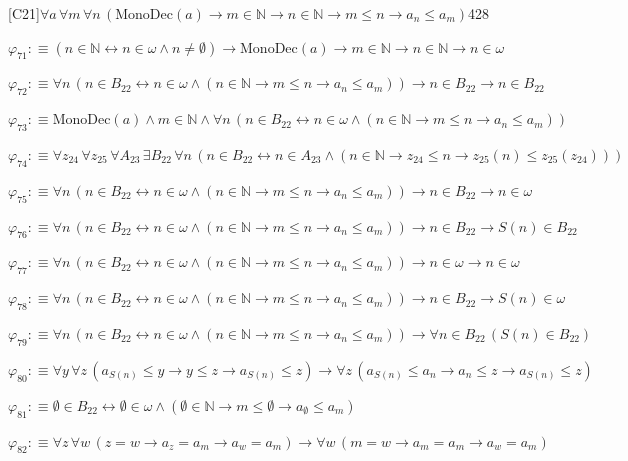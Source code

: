 \begin{fullproof}{[C21]}{$\forall a\,\forall m\,\forall n\,(\mathrm{MonoDec}(a) \to m \in \mathbb{N} \to n \in \mathbb{N} \to m \leq n \to a_{n} \leq a_{m})$}{428}
\begin{abbrevlist}
\item $\varphi_{71} :\equiv (n \in \mathbb{N} \leftrightarrow n \in \omega \land n \neq \emptyset) \to \mathrm{MonoDec}(a) \to m \in \mathbb{N} \to n \in \mathbb{N} \to n \in \omega$
\item $\varphi_{72} :\equiv \forall n\,(n \in B_{22} \leftrightarrow n \in \omega \land (n \in \mathbb{N} \to m \leq n \to a_{n} \leq a_{m})) \to n \in B_{22} \to n \in B_{22}$
\item $\varphi_{73} :\equiv \mathrm{MonoDec}(a) \land m \in \mathbb{N} \land \forall n\,(n \in B_{22} \leftrightarrow n \in \omega \land (n \in \mathbb{N} \to m \leq n \to a_{n} \leq a_{m}))$
\item $\varphi_{74} :\equiv \forall z_{24}\,\forall z_{25}\,\forall A_{23}\,\exists B_{22}\,\forall n\,(n \in B_{22} \leftrightarrow n \in A_{23} \land (n \in \mathbb{N} \to z_{24} \leq n \to z_{25}(n) \leq z_{25}(z_{24})))$
\item $\varphi_{75} :\equiv \forall n\,(n \in B_{22} \leftrightarrow n \in \omega \land (n \in \mathbb{N} \to m \leq n \to a_{n} \leq a_{m})) \to n \in B_{22} \to n \in \omega$
\item $\varphi_{76} :\equiv \forall n\,(n \in B_{22} \leftrightarrow n \in \omega \land (n \in \mathbb{N} \to m \leq n \to a_{n} \leq a_{m})) \to n \in B_{22} \to S(n) \in B_{22}$
\item $\varphi_{77} :\equiv \forall n\,(n \in B_{22} \leftrightarrow n \in \omega \land (n \in \mathbb{N} \to m \leq n \to a_{n} \leq a_{m})) \to n \in \omega \to n \in \omega$
\item $\varphi_{78} :\equiv \forall n\,(n \in B_{22} \leftrightarrow n \in \omega \land (n \in \mathbb{N} \to m \leq n \to a_{n} \leq a_{m})) \to n \in B_{22} \to S(n) \in \omega$
\item $\varphi_{79} :\equiv \forall n\,(n \in B_{22} \leftrightarrow n \in \omega \land (n \in \mathbb{N} \to m \leq n \to a_{n} \leq a_{m})) \to \forall n \in B_{22}\,(S(n) \in B_{22})$
\item $\varphi_{80} :\equiv \forall y\,\forall z\,(a_{S(n)} \leq y \to y \leq z \to a_{S(n)} \leq z) \to \forall z\,(a_{S(n)} \leq a_{n} \to a_{n} \leq z \to a_{S(n)} \leq z)$
\item $\varphi_{81} :\equiv \emptyset \in B_{22} \leftrightarrow \emptyset \in \omega \land (\emptyset \in \mathbb{N} \to m \leq \emptyset \to a_{\emptyset} \leq a_{m})$
\item $\varphi_{82} :\equiv \forall z\,\forall w\,(z = w \to a_{z} = a_{m} \to a_{w} = a_{m}) \to \forall w\,(m = w \to a_{m} = a_{m} \to a_{w} = a_{m})$

\end{abbrevlist}
\end{fullproof}
